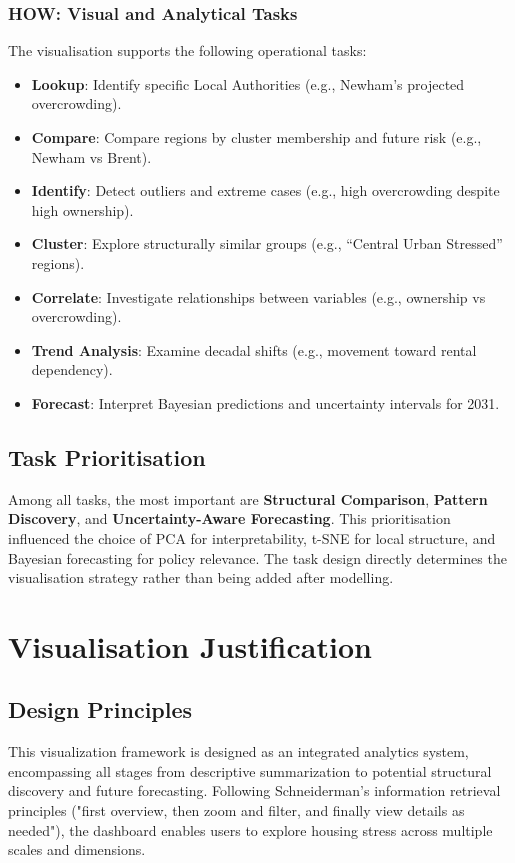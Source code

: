 \documentclass[conference]{IEEEtran}
\begin{document}
\subsubsection{HOW: Visual and Analytical Tasks}
The visualisation supports the following operational tasks:
\begin{itemize}
    \item \textbf{Lookup}: Identify specific Local Authorities (e.g., Newham's projected overcrowding).
    \item \textbf{Compare}: Compare regions by cluster membership and future risk (e.g., Newham vs Brent).
    \item \textbf{Identify}: Detect outliers and extreme cases (e.g., high overcrowding despite high ownership).
    \item \textbf{Cluster}: Explore structurally similar groups (e.g., ``Central Urban Stressed'' regions).
    \item \textbf{Correlate}: Investigate relationships between variables (e.g., ownership vs overcrowding).
    \item \textbf{Trend Analysis}: Examine decadal shifts (e.g., movement toward rental dependency).
    \item \textbf{Forecast}: Interpret Bayesian predictions and uncertainty intervals for 2031.
\end{itemize}

\subsection{Task Prioritisation}
Among all tasks, the most important are \textbf{Structural Comparison}, \textbf{Pattern Discovery}, and \textbf{Uncertainty-Aware Forecasting}. This prioritisation influenced the choice of PCA for interpretability, t-SNE for local structure, and Bayesian forecasting for policy relevance. The task design directly determines the visualisation strategy rather than being added after modelling.



\section{Visualisation Justification}

\subsection{Design Principles}
This visualization framework is designed as an integrated analytics system, encompassing all stages from descriptive summarization to potential structural discovery and future forecasting. Following Schneiderman's information retrieval principles ("first overview, then zoom and filter, and finally view details as needed"), the dashboard enables users to explore housing stress across multiple scales and dimensions\cite{shneiderman_eyes_1996}. 
\end{document}
